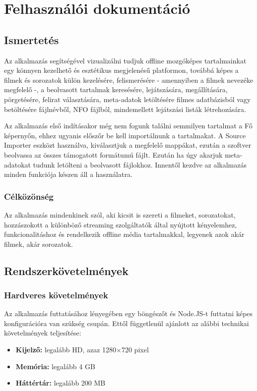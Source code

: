 \chapter{Felhasználói dokumentáció} %
\label{ch:user}

\section{Ismertetés}
Az alkalmazás segítségével vizualizálni tudjuk offline mozgóképes tartalmainkat egy könnyen kezelhető és esztétikus megjelenésű platformon, továbbá képes a filmek és sorozatok külön kezelésére, felismerésére - amennyiben a filmek nevezéke megfelelő -, a beolvasott tartalmak keresésére, lejátszására, megállítására, pörgetésére, felirat választására, meta-adatok letöltésére filmes adatbázisból vagy betöltésére fájlnévből, NFO fájlból, mindemellett lejátszási listák létrehozására.

Az alkalmazás első indításakor még nem fogunk találni semmilyen tartalmat a Fő képernyőn, ehhez ugyanis előszőr be kell importálnunk a tartalmakat. A Source Importer eszközt használva, kiválasztjuk a megfelelő mappákat, ezután a szoftver beolvassa az összes támogatott formátumú fájlt. Ezután ha úgy akarjuk meta-adatokat tudunk letölteni a beolvasott fájlokhoz. Innentől kezdve az alkalmazás minden funkciója készen áll a használatra.

\subsection{Célközönség}
Az alkalmazás mindenkinek szól, aki kicsit is szereti a filmeket, sorozatokat, hozzászokott a különböző streaming szolgáltatók által nyújtott kényelemhez, funkcionalitáshoz és rendelkezik offline média tartalmakkal, legyenek azok akár filmek, akár sorozatok.

\section{Rendszerkövetelmények}
\subsection{Hardveres követelmények}
Az alkalmazás futtatásához lényegében egy böngészőt és Node.JS-t futtatni képes konfigurációra van szükség csupán. Ettől függetlenül ajánlott az alábbi technikai követelmények teljesítése:
\begin{itemize}
    \item {\textbf {Kijelző: }} legalább HD, azaz 1280×720 pixel
	\item {\textbf {Memória: }} legalább 4 GB
	\item {\textbf {Háttértár: }} legalább 200 MB
\end{itemize}

